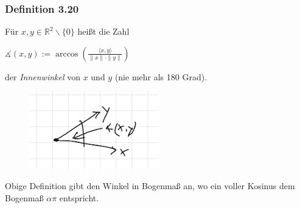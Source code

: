 \documentclass{article}
\begin{document}
\subsubsection*{Definition 3.20}
Für $x,y \in \mathbb{R}^2\backslash\{0\}$ heißt die Zahl \\
\begin{center}
    $\measuredangle (x,y) := \arccos \left( \frac{\langle x,y \rangle}{\|x\| \cdot \|y\|} \right)$
\end{center}
der \textit{Innenwinkel} von $x$ und $y$ (nie mehr als 180 Grad). \\
\begin{figure}[h]
    \centering
    \includegraphics[width=0.5\textwidth]{Images/3.20.jpeg}
    \caption{}
\end{figure}
Obige Definition gibt den Winkel in Bogenmaß an, wo ein voller Kosinus dem Bogenmaß $\alpha \pi$ entspricht. \\
\\
\end{document}

